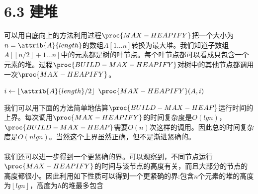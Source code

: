 \documentclass[a4paper,11pt]{article}
\newcommand{\floor}[1]{\left\lfloor #1 \right\rfloor}
\begin{document}
\section*{6.3 建堆}
可以用自底向上的方法利用过程$\proc{MAX-HEAPIFY}$把一个大小为$n=\attrib{A}{length}$的数组$A[1 \dots n]$转换为最大堆。我们知道子数组$A[\floor{n/2}+1\dots n]$中的元素都是树的叶节点。每个叶节点都可以看成只包含一个元素的堆。过程$\proc{BUILD-MAX-HEAPIFY}$对树中的其他节点都调用一次$\proc{MAX-HEAPIFY}$。
\begin{codebox}
	\li {} \gets {}
	\li \For $i \gets \floor{\attrib{A}{length}/2}$ 
	\li		\Then
				$\proc{MAX-HEAPIFY}(A,i)$
\end{codebox}
我们可以用下面的方法简单地估算$\proc{BUILD-MAX-HEAP}$运行时间的上界。每次调用$\proc{MAX-HEAPIFY}$的时间复杂度是$O(lgn)$，$\proc{BUILD-MAX-HEAP}$需要$O(n)$次这样的调用。因此总的时间复杂度是$O(nlgn)$。当然这个上界虽然正确，但不是渐进紧确的。
\paragraph*{}我们还可以进一步得到一个更紧确的界。可以观察到，不同节点运行$\proc{MAX-HEAPIFY}$的时间与该节点的高度有关，而且大部分的节点的高度都很小。因此利用如下性质可以得到一个更紧确的界:包含$n$个元素的堆的高度为$\floor{lgn}$，高度为$h$的堆最多包含
\end{document}
